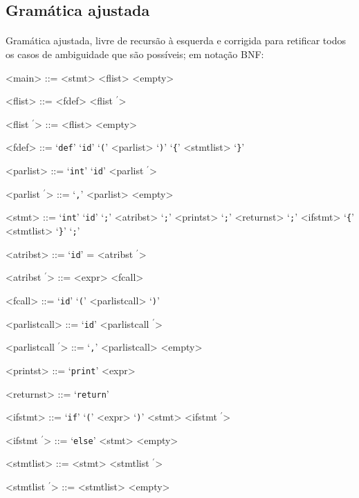 \documentclass[12pt]{article}
\newcommand{\pprime}{\ensuremath{^{\prime}}}
\begin{document}
\newpage
\subsection{Gramática ajustada}
\paragraph{}
Gramática ajustada, livre de recursão à esquerda e corrigida para retificar todos os casos de ambiguidade que são 
possíveis; em notação BNF:

\begin{multicols}{2}
\raggedcolumns
\setlength{\columnseprule}{0.2pt}
\begin{grammar}
<main> ::= <stmt> 
  \alt <flist> 
  \alt <empty>

<flist> ::= <fdef> <flist \pprime>

<flist \pprime> ::= <flist> 
  \alt <empty>

<fdef> ::= ‘\texttt{def}’ ‘\texttt{id}’ ‘\texttt{(}’ <parlist> ‘\texttt{)}’ ‘\texttt{\{}’ <stmtlist> ‘\texttt{\}}’

<parlist> ::= ‘\texttt{int}’ ‘\texttt{id}’ <parlist \pprime>

<parlist \pprime> ::= ‘\texttt{,}’ <parlist> 
  \alt <empty>

<stmt> ::= ‘\texttt{int}’ ‘\texttt{id}’ ‘\texttt{;}’
  \alt <atribst> ‘\texttt{;}’
  \alt <printst> ‘\texttt{;}’
  \alt <returnst> ‘\texttt{;}’
  \alt <ifstmt>
  \alt ‘\texttt{\{}’ <stmtlist> ‘\texttt{\}}’
  \alt ‘\texttt{;}’

<atribst> ::= ‘\texttt{id}’ = <atribst \pprime>

<atribst \pprime> ::= <expr> 
  \alt <fcall>

<fcall> ::= ‘\texttt{id}’ ‘\texttt{(}’ <parlistcall> ‘\texttt{)}’

<parlistcall> ::= ‘\texttt{id}’ <parlistcall \pprime>

<parlistcall \pprime> ::= ‘\texttt{,}’ <parlistcall> 
  \alt <empty>

<printst> ::= ‘\texttt{print}’ <expr>

<returnst> ::= ‘\texttt{return}’

<ifstmt> ::= ‘\texttt{if}’ ‘\texttt{(}’ <expr> ‘\texttt{)}’ <stmt> <ifstmt \pprime>

<ifstmt \pprime> ::= ‘\texttt{else}’ <stmt> 
  \alt <empty>

<stmtlist> ::= <stmt> <stmtlist \pprime>

<stmtlist \pprime> ::= <stmtlist> 
  \alt <empty>


\end{grammar}
\end{multicols}
\end{document}
